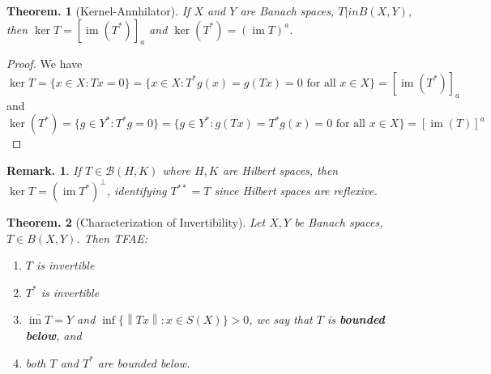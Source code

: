 \documentclass[11pt, a4paper]{memoir}
\newcommand{\norm}[1]{\ensuremath{\left\lVert#1\right\rVert}}
\theoremstyle{change}
\newtheorem{theorem}{Theorem.}[section]
\theoremstyle{plain}
\theoremstyle{nonumberplain}
\newtheorem{remark}{Remark.}
\newtheorem{proof}{Proof}
\DeclareMathOperator{\im}{im}
\numberwithin{equation}{section}
\begin{document}
\begin{theorem}[Kernel-Annhilator]
    If $X$ and $Y$ are Banach spaces, $T|in B(X,Y)$, then $\ker T=[\im(T^*)]_a$ and $\ker(T^*)=(\im T)^a$.
\end{theorem}
\begin{proof}
    We have
    \begin{equation*}
        \ker T = \{x\in X:Tx=0\}=\{x\in X:T^*g(x)=g(Tx)=0\text{ for all }x\in X\}=[\im(T^*)]_a
    \end{equation*}
    and
    \begin{equation*}
        \ker(T^*)= \{g\in Y^*:T^*g=0\}=\{g\in Y^*:g(Tx)=T^*g(x)=0\text{ for all }x\in X\}=[\im(T)]^a
    \end{equation*}
\end{proof}
\begin{remark}
    If $T\in \mathcal{B}(H,K)$ where $H,K$ are Hilbert spaces, then $\ker T=(\im T^*)^\perp$, identifying $T^{**}=T$ since Hilbert spaces are reflexive.
\end{remark}
\begin{theorem}[Characterization of Invertibility]
    Let $X,Y$ be Banach spaces, $T\in B(X,Y)$.
    Then TFAE:
    \begin{enumerate}[nl,r]
        \item $T$ is invertible
        \item $T^*$ is invertible
        \item $\overline{\im T}=Y$ and $\inf\{\norm{Tx}:x\in S(X)\}>0$, we say that $T$ is \textbf{bounded below}, and
        \item both $T$ and $T^*$ are bounded below.
    \end{enumerate}
\end{theorem}
\end{document}
